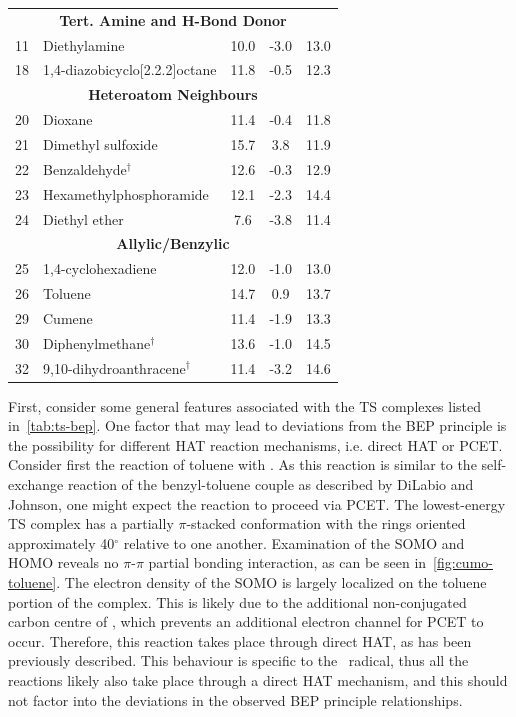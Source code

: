 \begin{table}[!htbp]
\begin{tabular}{l l c c c}
    \multicolumn{5}{c}{\textbf{Tert. Amine and H-Bond Donor}} \\
    11 & Diethylamine & 10.0 & -3.0 & 13.0 \\
    18 & 1,4-diazobicyclo[2.2.2]octane & 11.8 & -0.5 & 12.3 \\
    \hline
    \multicolumn{5}{c}{\textbf{Heteroatom Neighbours}} \\
    20 & Dioxane & 11.4 & -0.4 & 11.8 \\
    21 & Dimethyl sulfoxide & 15.7 & 3.8 & 11.9 \\
    22 & Benzaldehyde$^\dagger$ & 12.6 & -0.3 & 12.9 \\
    23 & Hexamethylphosphoramide & 12.1 & -2.3 & 14.4 \\
    24 & Diethyl ether & 7.6 & -3.8 & 11.4 \\
    \hline
    \multicolumn{5}{c}{\textbf{Allylic/Benzylic}}\\
    25 & 1,4-cyclohexadiene & 12.0 & -1.0 & 13.0 \\
    26 & Toluene & 14.7 & 0.9 & 13.7 \\
    29 & Cumene & 11.4 & -1.9 & 13.3 \\
    30 & Diphenylmethane$^\dagger$ & 13.6 & -1.0 & 14.5 \\
    32 & 9,10-dihydroanthracene$^\dagger$ & 11.4 & -3.2 & 14.6 \\
  \end{tabular}
\end{table}

First, consider some general features associated with the TS complexes listed in~\ref{tab:ts-bep}. One factor that may lead to deviations from the BEP principle is the possibility for different HAT reaction mechanisms, i.e. direct HAT or PCET. Consider first the reaction of toluene with \cumo. As this reaction is similar to the self-exchange reaction of the benzyl-toluene couple as described by DiLabio and Johnson,\cite{DiLabio2007} one might expect the reaction to proceed via PCET. The lowest-energy TS complex has a partially $\pi$-stacked conformation with the rings oriented approximately 40$^\circ$ relative to one another. Examination of the SOMO and HOMO reveals no $\pi$-$\pi$ partial bonding interaction, as can be seen in~\ref{fig:cumo-toluene}. The electron density of the SOMO is largely localized on the toluene portion of the complex. This is likely due to the additional non-conjugated carbon centre of \cumo, which prevents an additional electron channel for PCET to occur. Therefore, this reaction takes place through direct HAT, as has been previously described.\cite{Salamone2011} This behaviour is specific to the \cumo\ radical, thus all the reactions likely also take place through a direct HAT mechanism, and this should not factor into the deviations in the observed BEP principle relationships.

